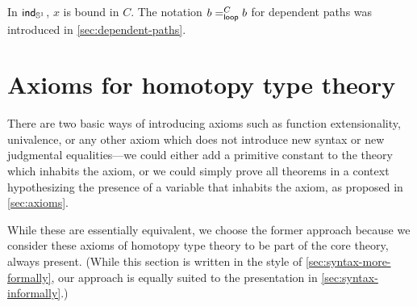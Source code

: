 
In $\ind{\Sn^1}$, $x$ is bound in $C$.  The notation ${\dpath C \lloop b b}$ for dependent paths was introduced in \autoref{sec:dependent-paths}.

\section{Axioms for homotopy type theory}

There are two basic ways of introducing axioms such as function extensionality,
univalence, or any other axiom which does not introduce new syntax or new
judgmental equalities---we could either add a primitive constant to the theory
which inhabits the axiom, or we could simply prove all theorems in a context
hypothesizing the presence of a variable that inhabits the axiom, as proposed in \autoref{sec:axioms}.

While these are essentially equivalent, we choose the former approach because we
consider these axioms of homotopy type theory to be part of the core theory,
always present. (While this section is written in the style of
\autoref{sec:syntax-more-formally}, our approach is equally suited to the
presentation in \autoref{sec:syntax-informally}.)

